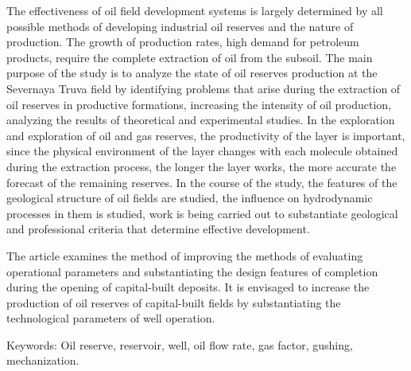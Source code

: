 The effectiveness of oil field development systems is largely determined
by all possible methods of developing industrial oil reserves and the
nature of production. The growth of production rates, high demand for
petroleum products, require the complete extraction of oil from the
subsoil. The main purpose of the study is to analyze the state of oil
reserves production at the Severnaya Truva field by identifying problems
that arise during the extraction of oil reserves in productive
formations, increasing the intensity of oil production, analyzing the
results of theoretical and experimental studies. In the exploration and
exploration of oil and gas reserves, the productivity of the layer is
important, since the physical environment of the layer changes with each
molecule obtained during the extraction process, the longer the layer
works, the more accurate the forecast of the remaining reserves. In the
course of the study, the features of the geological structure of oil
fields are studied, the influence on hydrodynamic processes in them is
studied, work is being carried out to substantiate geological and
professional criteria that determine effective development.

The article examines the method of improving the methods of evaluating
operational parameters and substantiating the design features of
completion during the opening of capital-built deposits. It is envisaged
to increase the production of oil reserves of capital-built fields by
substantiating the technological parameters of well operation.

Keywords: Oil reserve, reservoir, well, oil flow rate, gas factor,
gushing, mechanization.

